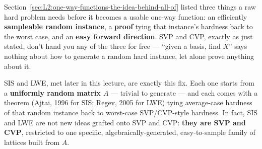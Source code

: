 Section~\ref{sec:L2:one-way-functions-the-idea-behind-all-of} listed three things a raw hard problem needs before it becomes a usable one-way function: an efficiently \textbf{sampleable random instance}, a \textbf{proof} tying that instance's hardness back to the worst case, and an \textbf{easy forward direction}. SVP and CVP, exactly as just stated, don't hand you any of the three for free --- ``given a basis, find $X$'' says nothing about how to generate a random hard instance, let alone prove anything about it.

SIS and LWE, met later in this lecture, are exactly this fix. Each one starts from a \textbf{uniformly random matrix $A$} --- trivial to generate --- and each comes with a theorem (Ajtai, 1996 for SIS; Regev, 2005 for LWE) tying average-case hardness of that random instance back to worst-case SVP/CVP-style hardness. In fact, SIS and LWE are not new ideas grafted onto SVP and CVP: \textbf{they are SVP and CVP}, restricted to one specific, algebraically-generated, easy-to-sample family of lattices built from $A$.

